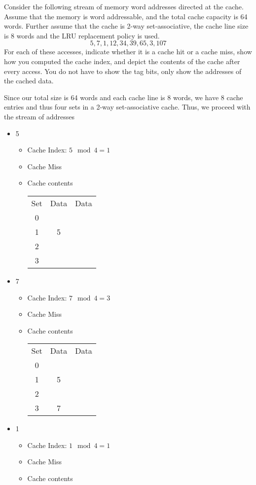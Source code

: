 \documentclass[12pt,letterpaper,twoside]{hmcpset}
\begin{document}
\begin{problem}[1]
 Consider the following stream of memory word addresses directed at the cache. Assume that the memory is word addressable, and the total cache capacity is 64 words. Further assume that the cache is 2-way set-associative, the cache line size is 8 words and the LRU replacement policy is used. 
\[5, 7, 1, 12, 34, 39, 65, 3, 107\]
For each of these accesses, indicate whether it is a cache hit or a cache miss, show how you computed the cache index, and depict the contents of the cache after every access. You do not have to show the tag bits, only show the addresses of the cached data.
\end{problem}

\begin{solution}
 Since our total size is 64 words and each cache line is 8 words, we have 8 cache entries and thus four sets in a 2-way set-associative cache.  Thus, we proceed with the stream of addresses
 \begin{itemize}
  \item 5
  \begin{itemize}
  \item Cache Index: $5 \mod{4} = 1$
  \item Cache Miss
  \item Cache contents
  
  \begin{tabular}{ccc}
    Set & Data & Data\\
    0 &  & \\
    1 & 5 & \\
    2 &  & \\
    3 &  & 
  \end{tabular}
  \end{itemize}
   \item 7
  \begin{itemize}
  \item Cache Index: $7 \mod{4} = 3$
  \item Cache Miss
  \item Cache contents
  
  \begin{tabular}{ccc}
    Set & Data & Data\\
    0 &  & \\
    1 & 5 & \\
    2 &  & \\
    3 & 7 & 
  \end{tabular}
  \end{itemize}
   \item 1
  \begin{itemize}
  \item Cache Index: $1 \mod{4} = 1$
  \item Cache Miss
  \item Cache contents
  

\end{itemize}
\end{itemize}
\end{solution}
\end{document}
